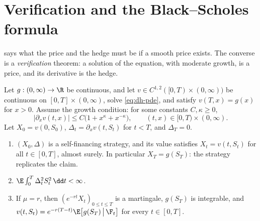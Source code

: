 \section{Verification and the Black--Scholes formula}\label{sec:dh-verification}

 says what the price and the hedge must be if a smooth price exists. The
converse is a \emph{verification} theorem: a solution of the equation, with moderate growth,
is a price, and its derivative is the hedge.

\begin{theorem}[Verification]\label{thm:dh-verification}
Let $g:(0,\infty)\to\R$ be continuous, and let $v\in C^{1,2}([0,T)\times(0,\infty))$ be
continuous on $[0,T]\times(0,\infty)$, solve \eqref{eq:dh-pde}, and satisfy $v(T,x)=g(x)$ for
$x>0$. Assume the growth condition: for some constants $C,\kappa\ge0$,
\begin{equation}\label{eq:dh-growth}
  |\partial_xv(t,x)|\le C\big(1+x^\kappa+x^{-\kappa}\big),\qquad(t,x)\in[0,T)\times(0,\infty).
\end{equation}
Let $X_0=v(0,S_0)$, $\Delta_t=\partial_xv(t,S_t)$ for $t<T$, and $\Delta_T=0$.
\begin{enumerate}[label=(\roman*)]
  \item $(X_0,\Delta)$ is a self-financing strategy, and its value satisfies $X_t=v(t,S_t)$ for
    all $t\in[0,T]$, almost surely. In particular $X_T=g(S_T)$: the strategy replicates the
    claim.
  \item $\E\int_0^T\Delta_t^2S_t^2\,\dd t<\infty$.
  \item If $\mu=r$, then $(e^{-rt}X_t)_{0\le t\le T}$ is a martingale, $g(S_T)$ is integrable,
    and $v(t,S_t)=e^{-r(T-t)}\E\big[g(S_T)\,\big|\,\F_t\big]$ for every $t\in[0,T]$.
\end{enumerate}
\end{theorem}

